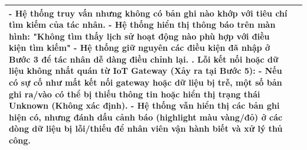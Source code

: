 \begin{longtable}{|>{\centering\arraybackslash}m{3cm}|m{13.7cm}|}
- Hệ thống truy vấn nhưng không có bản ghi nào khớp với tiêu chí tìm kiếm của tác nhân. \newline
- Hệ thống hiển thị thông báo trên màn hình: "Không tìm thấy lịch sử hoạt động nào phù hợp với điều kiện tìm kiếm" \newline
- Hệ thống giữ nguyên các điều kiện đã nhập ở Bước 3 để tác nhân dễ dàng điều chỉnh lại. \newline
2. Lỗi kết nối hoặc dữ liệu không nhất quán từ IoT Gateway (Xảy ra tại Bước 5): \newline
- Nếu có sự cố như mất kết nối gateway hoặc dữ liệu bị trễ, một số bản ghi ra/vào có thể bị thiếu thông tin hoặc hiển thị trạng thái Unknown (Không xác định). \newline
- Hệ thống vẫn hiển thị các bản ghi hiện có, nhưng đánh dấu cảnh báo (highlight màu vàng/đỏ) ở các dòng dữ liệu bị lỗi/thiếu để nhân viên vận hành biết và xử lý thủ công.\\ \hline
\end{longtable}
\endgroup

